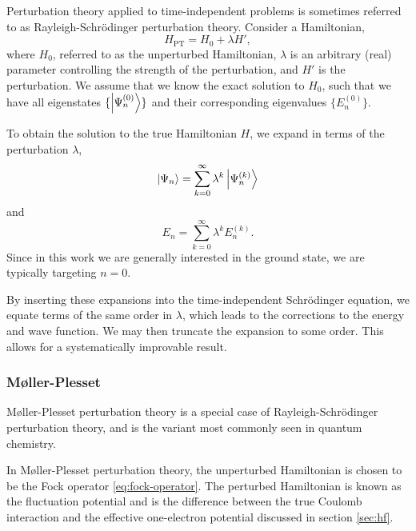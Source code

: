 Perturbation theory applied to time-independent problems is sometimes referred to as Rayleigh-Schr\"odinger perturbation theory.\cite{sakuraiModern2017,rayleighTheory1945,schrodingerQuantisierung1926} Consider a Hamiltonian,
\begin{equation}
H_\mathrm{PT} = H_0 + \lambda H',
\end{equation}
where $H_0$, referred to as the unperturbed Hamiltonian, $\lambda$ is an arbitrary (real) parameter controlling the strength of the perturbation, and $H'$ is the perturbation. We assume that we know the exact solution to $H_0$, such that we have all eigenstates $\{\ket{\Psi_n^{(0)}}\}$ and their corresponding eigenvalues $\{E_n^{(0)} \}$.

To obtain the solution to the true Hamiltonian $H$, we expand in terms of the perturbation $\lambda$,
\begin{equation}
\ket{\Psi_n} = \sum_{k=0}^\infty \lambda^k\ket{\Psi_n^{(k)}}
\end{equation}
and
\begin{equation}
E_n = \sum_{k=0}^\infty \lambda^kE_n^{(k)}.
\end{equation}
Since in this work we are generally interested in the ground state, we are typically targeting $n=0$.

By inserting these expansions into the time-independent Schr\"odinger equation, we equate terms of the same order in $\lambda$, which leads to the corrections to the energy and wave function. We may then truncate the expansion to some order. This allows for a systematically improvable result.

\subsubsection{M{\o}ller-Plesset}

M{\o}ller-Plesset perturbation theory\cite{mollerNote1934} is a special case of Rayleigh-Schr\"odinger perturbation theory, and is the variant most commonly seen in quantum chemistry.

In M{\o}ller-Plesset perturbation theory, the unperturbed Hamiltonian is chosen to be the Fock operator \ref{eq:fock-operator}. The perturbed Hamiltonian is known as the fluctuation potential and is the difference between the true Coulomb interaction and the effective one-electron potential discussed in section \ref{sec:hf}.

